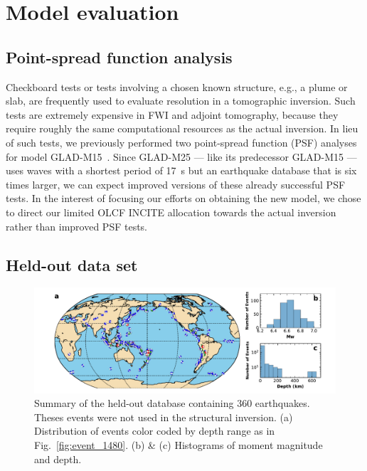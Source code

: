 \section{Model evaluation}
\label{section:evaluation}


\subsection{Point-spread function analysis}

Checkboard tests or tests involving a chosen known structure, e.g., a plume or slab,
are frequently used to evaluate resolution in a tomographic inversion.
Such tests are extremely expensive in FWI and adjoint tomography, because they
require roughly the same computational resources as the actual inversion.
In lieu of such tests, we previously performed two point-spread function (PSF) analyses
for model GLAD-M15~\cite{bozdaug2016global}.
Since GLAD-M25 --- like its predecessor GLAD-M15 --- uses waves with a shortest period of 17~s
but an earthquake database that is six times larger,
we can expect improved versions of these already successful PSF tests.
In the interest of focusing our efforts on obtaining the new model,
we chose to direct our limited OLCF INCITE allocation towards the actual inversion
rather than improved PSF tests.

\subsection{Held-out data set}

\begin{figure}
  \centering
  \includegraphics[width=\textwidth]{ch-GLADM25/figures/events_360.pdf}
  \caption{\small{Summary of the held-out database containing 360 earthquakes. Theses events were not used in the structural inversion. (a) Distribution of events color coded by depth range as in Fig.~\ref{fig:event_1480}. (b) \& (c) Histograms of moment magnitude and depth.}}
  \label{fig:events_360}
\end{figure}

